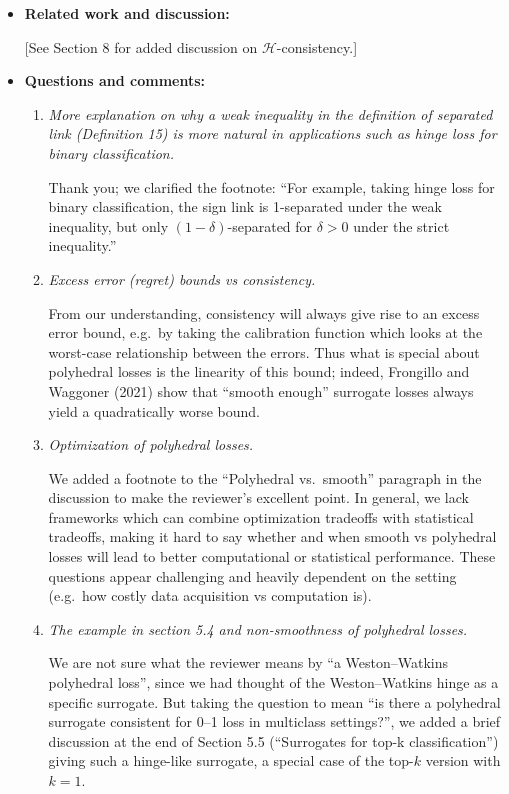 \documentclass[a4paper]{article}
\begin{document}
\begin{itemize}
\item \textbf{Related work and discussion:}

 [See Section 8 for added discussion on $\mathcal{H}$-consistency.]
  
\item \textbf{Questions and comments:}
  \begin{enumerate}
  \item \emph{More explanation on why a weak inequality in the definition of separated link (Definition 15) is more natural in applications such as hinge loss for binary classification.}

    Thank you; we clarified the footnote: ``For example, taking hinge loss for binary classification, the sign link is 1-separated under the weak inequality, but only $(1-\delta)$-separated for $\delta > 0$ under the strict inequality.''
    
  \item \emph{Excess error (regret) bounds vs consistency.}

    From our understanding, consistency will always give rise to an excess error bound, e.g.\ by taking the calibration function which looks at the worst-case relationship between the errors.
    Thus what is special about polyhedral losses is the linearity of this bound; indeed, Frongillo and Waggoner (2021) show that ``smooth enough'' surrogate losses always yield a quadratically worse bound.
    
  \item \emph{Optimization of polyhedral losses.}

    We added a footnote to the ``Polyhedral vs.\ smooth'' paragraph in the discussion to make the reviewer's excellent point.
    In general, we lack frameworks which can combine optimization tradeoffs with statistical tradeoffs, making it hard to say whether and when smooth vs polyhedral losses will lead to better computational or statistical performance.
    These questions appear challenging and heavily dependent on the setting (e.g.\ how costly data acquisition vs computation is).
    
  \item \emph{The example in section 5.4 and non-smoothness of polyhedral losses.}

    We are not sure what the reviewer means by ``a Weston--Watkins polyhedral loss'', since we had thought of the Weston--Watkins hinge as a specific surrogate.
    But taking the question to mean ``is there a polyhedral surrogate consistent for 0--1 loss in multiclass settings?'', we added a brief discussion at the end of Section 5.5 (``Surrogates for top-k classification'') giving such a hinge-like surrogate, a special case of the top-$k$ version with $k=1$.
    

\end{enumerate}
\end{itemize}
\end{document}
